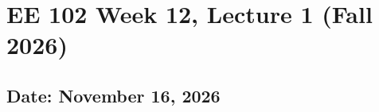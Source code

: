 \documentclass{ee102_notes}
\renewcommand{\releasedate}{November 16, 2026}
\begin{document}
\section*{EE 102 Week 12, Lecture 1 (Fall 2026)}
\subsection*{Date: \releasedate}
\tableofcontents

\end{document}
